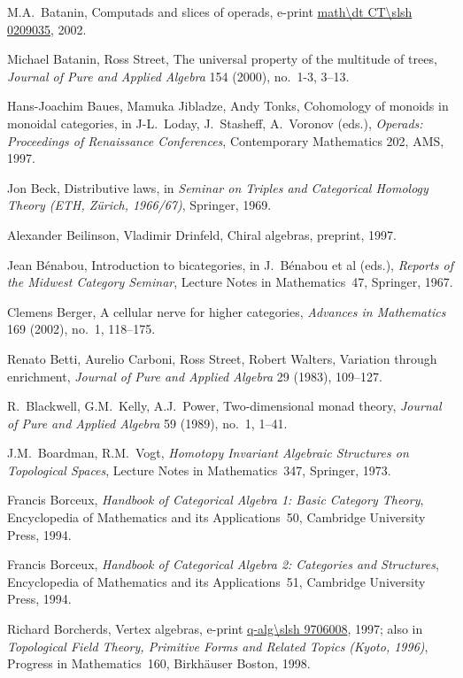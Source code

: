 \begin{thebibliography}{c9999}
M.A.~Batanin,
Computads and slices of operads,
e-print \url{math\dt CT\slsh 0209035}, 2002.

Michael Batanin, Ross Street,
The universal property of the multitude of
trees, 
\emph{Journal of Pure and Applied Algebra} 154 (2000), no.~1-3, 3--13.

Hans-Joachim Baues, Mamuka Jibladze, Andy Tonks,
Cohomology of monoids in monoidal categories,
in J-L.~Loday, J.~Stasheff, A.~Voronov (eds.), \emph{Operads: Proceedings
of Renaissance Conferences}, Contemporary Mathematics 202, AMS, 1997.

Jon Beck,
Distributive laws,
in 
\emph{Seminar on Triples and Categorical Homology Theory (ETH, Z\"urich,
1966/67)},  
Springer, 1969.

Alexander Beilinson, Vladimir Drinfeld, Chiral algebras, preprint,
1997. 

Jean B\'enabou, 
Introduction to bicategories,
in
J.~B\'enabou et al (eds.), \emph{Reports of the Midwest Category Seminar},
Lecture Notes in Mathematics~47, Springer, 1967.

Clemens Berger,
A cellular nerve for higher categories,
\emph{Advances in Mathematics} 169 (2002), no.~1, 118--175.

Renato Betti, Aurelio Carboni, Ross Street, Robert Walters,
Variation through enrichment,
\emph{Journal of Pure and Applied Algebra} 29 (1983), 109--127.

R.~Blackwell, G.M.~Kelly, A.J.~Power,
Two-dimensional monad theory,
\emph{Journal of Pure and Applied Algebra} 59 (1989), no.~1, 1--41.

J.M.~Boardman, R.M.~Vogt, 
\emph{Homotopy Invariant Algebraic Structures on
Topological Spaces},
Lecture Notes in Mathematics~347,
Springer, 1973.

Francis Borceux, 
\emph{Handbook of Categorical Algebra 1: Basic Category Theory},
Encyclopedia of Mathematics and its Applications~50,
Cambridge University Press, 1994.

Francis Borceux, 
\emph{Handbook of Categorical Algebra 2: Categories and
Structures},
Encyclopedia of Mathematics and its Applications~51,
Cambridge University Press, 1994.

Richard Borcherds, 
Vertex algebras, 
e-print \url{q-alg\slsh 9706008}, 1997;
also in 
\emph{Topological Field Theory, Primitive Forms and Related Topics
(Kyoto, 1996)},
Progress in Mathematics~160,
Birkh\"auser Boston, 1998.


\end{thebibliography}
